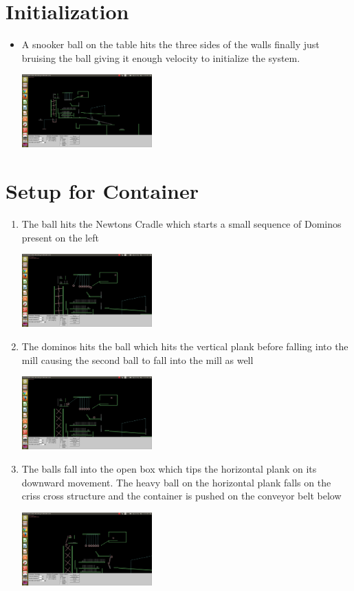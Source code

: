 \documentclass[]{report}
\begin{document}
\section{Initialization}
\begin{itemize}
\item A snooker ball on the table hits the three sides of the walls finally just bruising the ball giving it enough velocity to initialize the system.
\begin{center}
\includegraphics[width=5cm]{img/FirstContact}
\end{center}
\end{itemize}

\section{Setup for Container}
\begin{enumerate}
\item The ball hits the Newtons Cradle which starts a small sequence of Dominos present on the left
\begin{center}
\includegraphics[width=5cm]{img/SecondContact}
\end{center}
\item The dominos hits the ball which hits the vertical plank before falling into the mill causing the second ball to fall into the mill as well
\begin{center}
\includegraphics[width=5cm]{img/ThirdContact}
\end{center}
\item The balls fall into the open box which tips the horizontal plank on its downward movement. The heavy ball on the horizontal plank falls on the criss cross structure and the container is pushed on the conveyor belt below
\begin{center}
\includegraphics[width=5cm]{img/FourthContact}
\end{center}
\end{enumerate}
\end{document}
